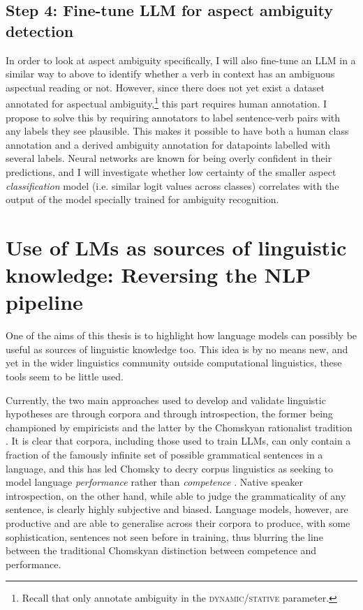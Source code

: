 \subsection*{Step 4: Fine-tune LLM for aspect ambiguity detection}
In order to look at aspect ambiguity specifically, I will also fine-tune an LLM in a similar way to above to identify whether a verb in context has an ambiguous aspectual reading or not. However, since there does not yet exist a dataset annotated for aspectual ambiguity,\footnote{Recall that \citet{Friedrich2014AutomaticPO} only annotate ambiguity in the \textsc{dynamic/stative} parameter.} this part requires human annotation. I propose to solve this by requiring annotators to label sentence-verb pairs with any labels they see plausible. This makes it possible to have both a human class annotation and a derived ambiguity annotation for datapoints labelled with several labels. Neural networks are known for being overly confident in their predictions, and I will investigate whether low certainty of the smaller aspect \emph{classification} model (i.e. similar logit values across classes) correlates with the output of the model specially trained for ambiguity recognition.

\section{Use of LMs as sources of linguistic knowledge: Reversing the NLP pipeline}
One of the aims of this thesis is to highlight how language models can possibly be useful as sources of linguistic knowledge too. This idea is by no means new, and yet in the wider linguistics community outside computational linguistics, these tools seem to be little used.

Currently, the two main approaches used to develop and validate linguistic hypotheses are through corpora and through introspection, the former being championed by empiricists and the latter by the Chomskyan rationalist tradition \citep{corpus_textbook}. It is clear that corpora, including those used to train LLMs, can only contain a fraction of the famously infinite set of possible grammatical sentences in a language, and this has led Chomsky to decry corpus linguistics as seeking to model language \emph{performance} rather than \emph{competence} \citep{corpus_textbook}. Native speaker introspection, on the other hand, while able to judge the grammaticality of any sentence, is clearly highly subjective and biased. Language models, however, are productive and are able to generalise across their corpora to produce, with some sophistication, sentences not seen before in training, thus blurring the line between the traditional Chomskyan distinction between competence and performance.

